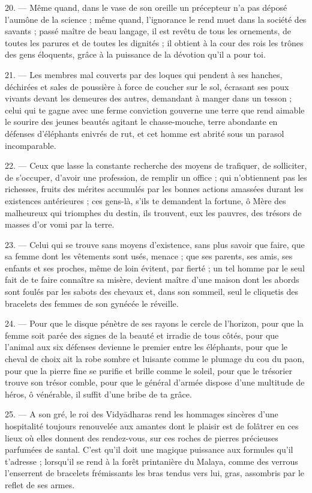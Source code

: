 \documentclass[a4paper, 11pt, oneside, french]{article}
\begin{document}
20. --- Même quand, dans le vase de son oreille un précepteur n'a pas déposé l'aumône de la science ; même quand, l'ignorance le rend muet dans la société des savants ; passé maître de beau langage, il est revêtu de tous les ornements, de toutes les parures et de toutes les dignités ; il obtient à la cour des rois les trônes des gens éloquents, grâce à la puissance de la dévotion qu'il a pour toi.

21. --- Les membres mal couverts par des loques qui pendent à ses hanches, déchirées et sales de poussière à force de coucher sur le sol, écrasant ses poux vivants devant les demeures des autres, demandant à manger dans un tesson ; celui qui te gagne avec une ferme conviction gouverne une terre que rend aimable le sourire des jeunes beautés agitant le chasse-mouche, terre abondante en défenses d'éléphants enivrés de rut, et cet homme est abrité sous un parasol incomparable.

22. --- Ceux que lasse la constante recherche des moyens de trafiquer, de solliciter, de s'occuper, d'avoir une profession, de remplir un office ; qui n'obtiennent pas les richesses, fruits des mérites accumulés par les bonnes actions amassées durant les existences antérieures ; ces gens-là, s'ils te demandent la fortune, ô Mère des malheureux qui triomphes du destin, ils trouvent, eux les pauvres, des trésors de masses d'or vomi par la terre.

23. --- Celui qui se trouve sans moyens d'existence, sans plus savoir que faire, que sa femme dont les vêtements sont usés, menace ; que ses parents, ses amis, ses enfants et ses proches, même de loin évitent, par fierté ; un tel homme par le seul fait de te faire connaître sa misère, devient maître d'une maison dont les abords sont foulés par les sabots des chevaux et, dans son sommeil, seul le cliquetis des bracelets des femmes de son gynécée le réveille.

24. --- Pour que le disque pénètre de ses rayons le cercle de l'horizon, pour que la femme soit parée des signes de la beauté et irradie de tous côtés, pour que l'animal aux six défenses devienne le premier entre les éléphants, pour que le cheval de choix ait la robe sombre et luisante comme le plumage du cou du paon, pour que la pierre fine se purifie et brille comme le soleil, pour que le trésorier trouve son trésor comble, pour que le général d'armée dispose d'une multitude de héros, ô vénérable, il suffit d'une bribe de ta grâce.

25. --- A son gré, le roi des Vidy\={a}dharas rend les hommages sincères d'une hospitalité toujours renouvelée aux amantes dont le plaisir est de folâtrer en ces lieux où elles donnent des rendez-vous, sur ces roches de pierres précieuses parfumées de santal. C'est qu'il doit une magique puissance aux formules qu'il t'adresse ; lorsqu'il se rend à la forêt printanière du Malaya, comme des verrous l'enserrent de bracelets frémissants les bras tendus vers lui, gras, assombris par le reflet de ses armes.
\end{document}
